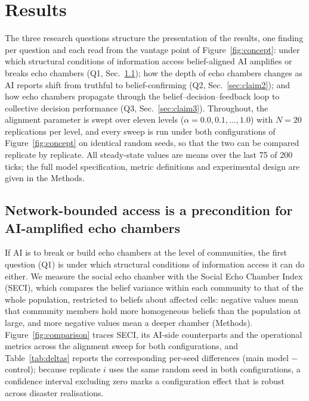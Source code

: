 \documentclass[pdflatex,sn-basic]{sn-jnl}
\begin{document}
\section{Results}\label{sec:results}

The three research questions structure the presentation of the results, one finding per question and each read from the vantage point of Figure~\ref{fig:concept}: under which structural conditions of information access belief-aligned AI amplifies or breaks echo chambers (Q1, Sec.~\ref{sec:claim1}); how the depth of echo chambers changes as AI reports shift from truthful to belief-confirming (Q2, Sec.~\ref{sec:claim2}); and how echo chambers propagate through the belief--decision--feedback loop to collective decision performance (Q3, Sec.~\ref{sec:claim3}). Throughout, the alignment parameter is swept over eleven levels ($\alpha = 0.0, 0.1, \ldots, 1.0$) with $N = 20$ replications per level, and every sweep is run under both configurations of Figure~\ref{fig:concept} on identical random seeds, so that the two can be compared replicate by replicate. All steady-state values are means over the last 75 of 200 ticks; the full model specification, metric definitions and experimental design are given in the Methods.

\subsection{Network-bounded access is a precondition for AI-amplified echo chambers}\label{sec:claim1}

If AI is to break or build echo chambers at the level of communities, the first question (Q1) is under which structural conditions of information access it can do either. We measure the social echo chamber with the Social Echo Chamber Index (SECI), which compares the belief variance within each community to that of the whole population, restricted to beliefs about affected cells: negative values mean that community members hold more homogeneous beliefs than the population at large, and more negative values mean a deeper chamber (Methods). Figure~\ref{fig:comparison} traces SECI, its AI-side counterparts and the operational metrics across the alignment sweep for both configurations, and Table~\ref{tab:deltas} reports the corresponding per-seed differences (main model $-$ control); because replicate $i$ uses the same random seed in both configurations, a confidence interval excluding zero marks a configuration effect that is robust across disaster realisations.
\end{document}
